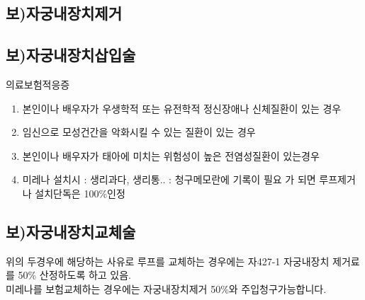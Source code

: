 \subsection{보)자궁내장치제거}
{}

\subsection{보)자궁내장치삽입술}
의료보험적응증 
\begin{enumerate}[1)]\tightlist
\item 본인이나 배우자가 우생학적 또는 유전학적 정신장애나 신체질환이 있는 경우
\item 임신으로 모성건간을 악화시킬 수 있는 질환이 있는 경우
\item 본인이나 배우자가 태아에 미치는 위험성이 높은 전염성질환이 있는경우
\item 미레나 설치시 : 생리과다, 생리통.. : 청구메모란에 기록이 필요 가 되면 루프제거나 설치단독은 100\%인정
\end{enumerate}

\subsection{보)자궁내장치교체술}
위의 두경우에 해당하는 사유로 루프를 교체하는 경우에는 자427-1 자궁내장치 제거료를 50\% 산정하도록 하고 있음.\\
미레나를 보험교체하는 경우에는 자궁내장치제거 50\%와 주입청구가능합니다.


